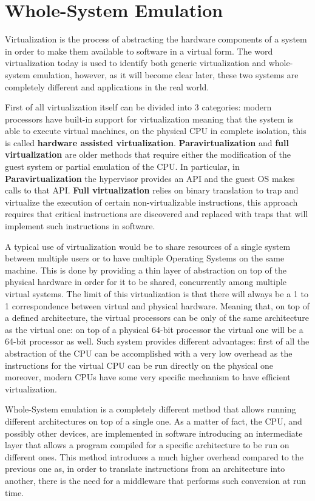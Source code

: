 \chapter{Whole-System Emulation}
\label{chap:3}

Virtualization is the process of abstracting the hardware components of a system in order to make them available to software in a virtual form.
The word virtualization today is used to identify both generic virtualization and whole-system emulation, however, as it will become clear later, these two systems are completely different and applications in the real world.

First of all virtualization itself can be divided into 3 categories: modern processors have built-in support for virtualization meaning that the system is able to execute virtual machines, on the physical CPU in complete isolation, this is called \textbf{hardware assisted virtualization}. \textbf{Paravirtualization} and \textbf{full virtualization} are older methods that require either the modification of the guest system or partial emulation of the CPU. In particular, in \textbf{Paravirtualization} the hypervisor provides an API and the guest OS makes calls to that API. \textbf{Full virtualization} relies on binary translation to trap and virtualize the execution of certain non-virtualizable instructions, this approach requires that critical instructions are discovered and replaced with traps that will implement such instructions in software.

A typical use of virtualization would be to share resources of a single system between multiple users or to have multiple Operating Systems on the same machine. This is done by providing a thin layer of abstraction on top of the physical hardware in order for it to be shared, concurrently among multiple virtual systems. The limit of this virtualization is that there will always be a 1 to 1 correspondence between virtual and physical hardware. Meaning that, on top of a defined architecture, the virtual processors can be only of the same architecture as the virtual one: on top of a physical 64-bit processor the virtual one will be a 64-bit processor as well. Such system provides different advantages: first of all the abstraction of the CPU can be accomplished with a very low overhead as the instructions for the virtual CPU can be run directly on the physical one moreover, modern CPUs have some very specific mechanism to have efficient virtualization.

Whole-System emulation is a completely different method that allows running different architectures on top of a single one. As a matter of fact, the CPU, and possibly other devices, are implemented in software introducing an intermediate layer that allows a program compiled for a specific architecture to be run on different ones. This method introduces a much higher overhead compared to the previous one as, in order to translate instructions from an architecture into another, there is the need for a middleware that performs such conversion at run time.

